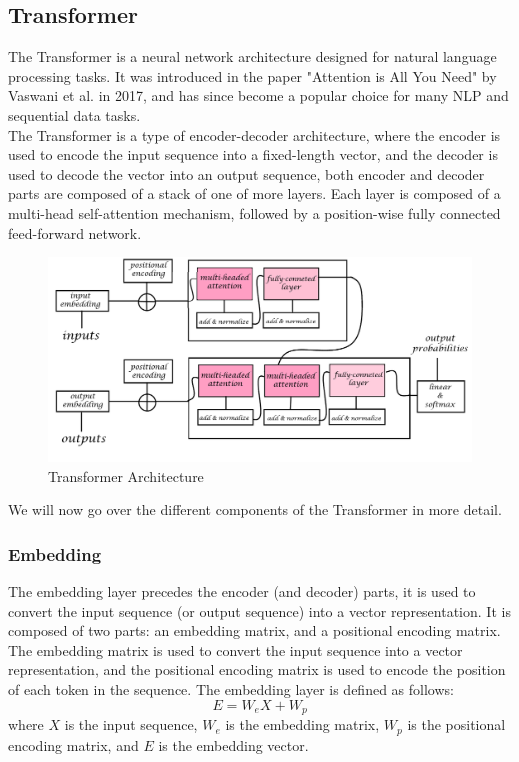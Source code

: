 \documentclass[a4paper, noexaminfo]{sapthesis}
\begin{document}
\subsection{Transformer}
The Transformer is a neural network architecture designed for natural
 language processing tasks. It was introduced in the paper "Attention
  is All You Need" by Vaswani et al. in 2017\cite{attention}, and has since become 
  a popular choice for many NLP and sequential data tasks.\newline \\
 The Transformer
   is a type of encoder-decoder architecture, where the encoder is used 
   to encode the input sequence into a fixed-length vector, and the 
   decoder is used to decode the vector into an output sequence, both 
   encoder and decoder parts are composed of a stack of one of more layers.
    Each layer is composed of a multi-head self-attention mechanism, followed 
  by a position-wise fully connected feed-forward network.\newline
\begin{figure}[h]
  \includegraphics[scale=0.42]{transformer}
  \centering
  \caption{Transformer Architecture}\label{fig:transformer}
  \end{figure}
We will now go over the different components of the Transformer in more
 detail.
\subsubsection{Embedding}
The embedding layer precedes the encoder (and decoder) parts, it is used to convert 
the input sequence (or output sequence) into a vector
 representation. It is composed of two parts: an 
 embedding matrix, and a positional encoding matrix. The embedding matrix
  is used to convert the input sequence into a vector representation, and
   the positional encoding matrix is used to encode the position of each 
   token in the sequence. The embedding layer is defined as follows:
   \begin{equation}
     E = W_{e}X + W_p
     \end{equation}
where $X$ is the input sequence, $W_e$ is the embedding matrix, $W_p$ is the
 positional encoding matrix, and $E$ is the embedding vector.
\end{document}
